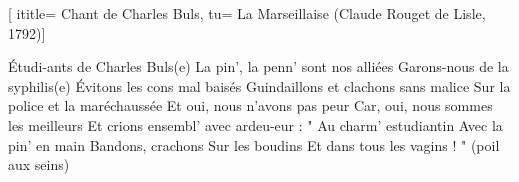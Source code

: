  [
ititle= {Chant de Charles Buls},
tu= {La Marseillaise (Claude Rouget de Lisle, 1792)}]

\beginverse
Étudi-ants de Charles Buls(e)
La pin', la penn' sont nos alliées
Garons-nous de la syphilis(e)
Évitons les cons mal baisés
Guindaillons et clachons sans malice
Sur la police et la maréchaussée
Et oui, nous n'avons pas peur
Car, oui, nous sommes les meilleurs
Et crions ensembl' avec ardeu-eur :
" Au charm' estudiantin
Avec la pin' en main
Bandons, crachons
Sur les boudins
Et dans tous les vagins ! " (poil aux seins)
\endverse

\endsong

